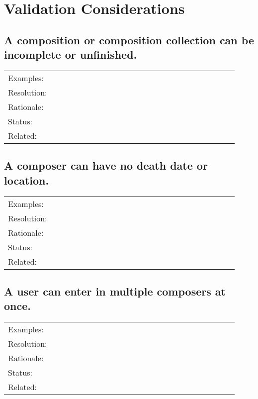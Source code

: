 \documentclass[letterpaper]{report}
\begin{document}
\chapter{Validation Considerations}

\section{A composition or composition collection can be incomplete or unfinished.}
\label{V.1}

\begin{tabular}{ p{0.1\linewidth} p{0.825\linewidth} }
  Examples:  &  \\ 
  Resolution:  &  \\
  Rationale:  &  \\
  Status:  &  \\
  Related:  & 
\end{tabular}

\section{A composer can have no death date or location.}
\label{V.2}

\begin{tabular}{ p{0.1\linewidth} p{0.825\linewidth} }
  Examples:  &  \\ 
  Resolution:  &  \\
  Rationale:  &  \\
  Status:  &  \\
  Related:  & 
\end{tabular}

\section{A user can enter in multiple composers at once.}
\label{V.3}

\begin{tabular}{ p{0.1\linewidth} p{0.825\linewidth} }
  Examples:  &  \\ 
  Resolution:  &  \\
  Rationale:  &  \\
  Status:  &  \\
  Related:  & 
\end{tabular}
\end{document}
